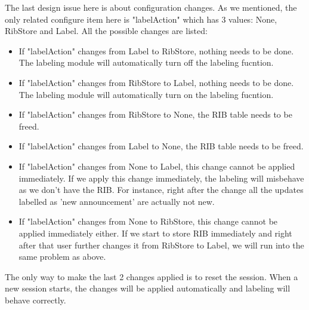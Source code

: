 The last design issue here is about configuration changes. As we mentioned, the only related configure item here is "labelAction" which has 3 values: None, RibStore and Label. All the possible changes are listed:
\begin{itemize}
\item{If "labelAction" changes from Label to RibStore, nothing needs to be done. The labeling module will automatically turn off the labeling fucntion.}
\item{If "labelAction" changes from RibStore to Label, nothing needs to be done. The labeling module will automatically turn on the labeling fucntion.}
\item{If "labelAction" changes from RibStore to None, the RIB table needs to be freed.}
\item{If "labelAction" changes from Label to None, the RIB table needs to be freed.} 
\item{If "labelAction" changes from None to Label, this change cannot be applied immediately. If we apply this change immediately, the labeling will misbehave as we don't have the RIB. For instance, right after the change all the updates labelled as 'new announcement' are actually not new. } 
\item{If "labelAction" changes from None to RibStore,  this change cannot be applied immediately either. If we start to store RIB immediately and right after that user further changes it from RibStore to Label, we will run into the same problem as above. } 
\end{itemize}
The only way to make the last 2 changes applied is to reset the session. When a new session starts, the changes will be applied automatically and labeling will behave correctly.
